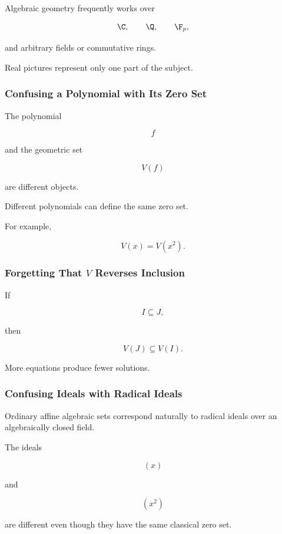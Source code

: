 Algebraic geometry frequently works over

\[
\C,
\qquad
\Q,
\qquad
\F_p,
\]

and arbitrary fields or commutative rings.

Real pictures represent only one part of the subject.

\subsubsection{Confusing a Polynomial with Its Zero Set}

The polynomial

\[
f
\]

and the geometric set

\[
V(f)
\]

are different objects.

Different polynomials can define the same zero set.

For example,

\[
\boxed{
V(x)=V(x^2).
}
\]

\subsubsection{Forgetting That \(V\) Reverses Inclusion}

If

\[
I\subseteq J,
\]

then

\[
\boxed{
V(J)\subseteq V(I).
}
\]

More equations produce fewer solutions.

\subsubsection{Confusing Ideals with Radical Ideals}

Ordinary affine algebraic sets correspond naturally to radical ideals over
an algebraically closed field.

The ideals

\[
(x)
\]

and

\[
(x^2)
\]

are different even though they have the same classical zero set.

